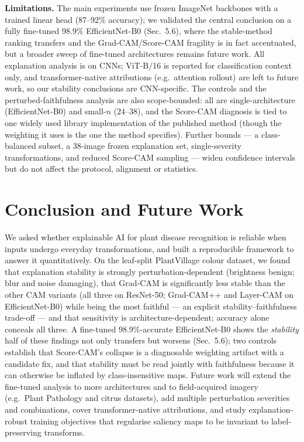 \documentclass[runningheads]{llncs}
\begin{document}
\smallskip
\noindent\textbf{Limitations.} The main experiments use frozen ImageNet backbones
with a trained linear head (87--92\% accuracy); we validated the central conclusion
on a fully fine-tuned 98.9\% EfficientNet-B0 (Sec.~5.6), where the stable-method
ranking transfers and the Grad-CAM/Score-CAM fragility is in fact accentuated, but
a broader sweep of fine-tuned architectures remains future work. All explanation
analysis is on CNNs; ViT-B/16 is reported for classification context only, and
transformer-native attributions (e.g.\ attention rollout) are left to future work,
so our stability conclusions are CNN-specific. The controls and the perturbed-faithfulness
analysis are also scope-bounded: all are single-architecture (EfficientNet-B0) and
small-$n$ ($24$--$38$), and the Score-CAM diagnosis is tied to one widely used
library implementation of the published method (though the weighting it uses is the
one the method specifies). Further bounds --- a class-balanced subset, a 38-image frozen
explanation set, single-severity transformations, and reduced Score-CAM sampling ---
widen confidence intervals but do not affect the protocol, alignment or statistics.

\section{Conclusion and Future Work}\label{sec:concl}
We asked whether explainable AI for plant disease recognition is reliable when
inputs undergo everyday transformations, and built a reproducible framework to
answer it quantitatively. On the leaf-split PlantVillage colour dataset, we found
that explanation stability is strongly perturbation-dependent (brightness benign;
blur and noise damaging), that Grad-CAM is significantly
less stable than the other CAM variants (all three on ResNet-50; Grad-CAM++ and
Layer-CAM on EfficientNet-B0) while being the most faithful --- an explicit
stability--faithfulness trade-off --- and that sensitivity is architecture-dependent;
accuracy alone conceals all three. A fine-tuned
98.9\%-accurate EfficientNet-B0 shows the \emph{stability} half of these findings
not only transfers but worsens (Sec.~5.6); two controls establish that Score-CAM's
collapse is a diagnosable weighting artifact with a candidate fix, and that stability
must be read jointly with faithfulness because it can otherwise be inflated by
class-insensitive maps. Future work will extend the fine-tuned analysis to more
architectures and to field-acquired imagery (e.g.\ Plant Pathology and citrus
datasets), add multiple perturbation severities and combinations, cover
transformer-native attributions, and study explanation-robust training objectives
that regularise saliency maps to be invariant to label-preserving transforms.
\end{document}

